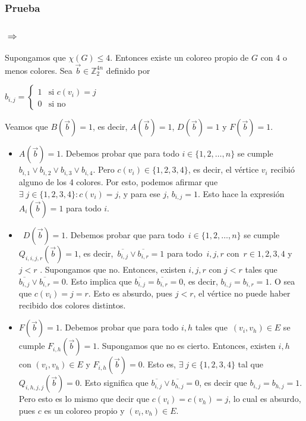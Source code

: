 \documentclass[10pt,a4paper]{article}
\begin{document}
\subsubsection*{Prueba}

\subsubsection*{$\Rightarrow$}

Supongamos que $\chi(G) \leq 4$. Entonces existe un coloreo propio de $G$ con 4 o menos colores. Sea $\overrightarrow{b} \in \mathbb{Z}_2^{4n}$ definido por

\begin{center}
$b_{i,j} = \begin{cases} 1 &\text{si } c(v_i) = j\\ 0 & \text{si no} \end{cases}$
\end{center}

Veamos que $B(\overrightarrow{b}) = 1$, es decir, $A(\overrightarrow{b}) = 1$, $D(\overrightarrow{b}) = 1$ y $F(\overrightarrow{b}) = 1$.

\begin{itemize}

	\item $A(\overrightarrow{b}) = 1$. Debemos probar que para todo $i \in \{1, 2, \dots, n\}$ se cumple $b_{i,1} \lor b_{i,2} \lor b_{i,3} \lor b_{i,4}$. Pero $c(v_i) \in \{1, 2, 3, 4\}$, es decir, el vértice $v_i$ recibió alguno de los 4 colores. Por esto, podemos afirmar que $\exists \; j \in \{1, 2, 3, 4\} : c(v_i) = j $, y para ese $j$, $b_{i,j} = 1$. Esto hace la expresión $A_i(\overrightarrow{b}) = 1$ para todo $i$.
	\item  $D(\overrightarrow{b}) = 1$. Debemos probar que para todo $i \in \{1, 2, \dots, n\}$ se cumple $Q_{i,i,j,r}(\overrightarrow{b}) = 1$, es decir, $\overline{b_{i,j}} \lor \overline{b_{i,r}}=1$ para todo $i, j, r$ con $r \in {1, 2, 3, 4}$ y $j < r$ . Supongamos que no. Entonces, existen $i, j, r$ con $j < r$ tales que $\overline{b_{i,j}} \lor \overline{b_{i,r}}=0$. Esto implica que $\overline{b_{i,j}}=\overline{b_{i,r}}=0$, es decir, $b_{i,j} = b_{i,r} = 1$. O sea que $c(v_i) = j = r$. Esto es absurdo, pues $j < r$, el vértice no puede haber recibido dos colores distintos.
	\item $F(\overrightarrow{b}) = 1$. Debemos probar que para todo $i, h$ tales que $(v_i, v_h) \in E$ se cumple $F_{i,h}(\overrightarrow{b}) = 1$. Supongamos que no es cierto. Entonces, existen $i, h$ con $(v_i, v_h) \in E$ y $F_{i,h}(\overrightarrow{b}) = 0$. Esto es, $\exists\; j \in \{1,2,3,4\}$ tal que $Q_{i,h,j,j}(\overrightarrow{b}) = 0$. Esto significa que $\overline{b_{i,j}} \lor \overline{b_{h,j}}=0$, es decir que $b_{i,j} = b_{h,j} = 1$. Pero esto es lo mismo que decir que $c(v_i) = c(v_h) = j$, lo cual es absurdo, pues $c$ es un coloreo propio y $(v_i, v_h) \in E$.
\end{itemize}
\end{document}
